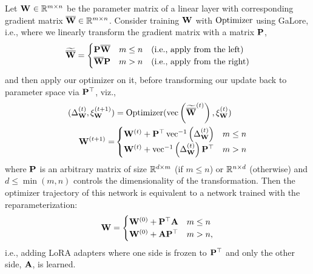 \begin{corollary}
Let ${\mathbf{W}}^{} \in \mathbb{R}^{m \times n}$ be the parameter matrix of a linear layer with corresponding gradient matrix $\overline{{\mathbf{W}}} \in \mathbb{R}^{m \times n}$.
Consider training ${\mathbf{W}}$ with $\operatorname{Optimizer}$ using GaLore, i.e., where we linearly transform the gradient matrix with a matrix ${\mathbf{P}}$,
\begin{align*}
    \widetilde{\overline{{\mathbf{W}}}} = \begin{cases}
        \mathbf{P} \overline{{\mathbf{W}}} & m \le n \,\,\,\,\,\, \text{(i.e., apply from the left)}\\
        \overline{{\mathbf{W}}} {\mathbf{P}} & m > n \,\,\,\,\,\, \text{(i.e., apply from the right)}\\
    \end{cases}
\end{align*}
and then apply our optimizer on it, before transforming our update back to parameter space via ${\mathbf{P}}^\top$, viz.,%
\begin{align*}
   (\Delta_{{\mathbf{W}}}^{(t)}, \xi_{{\mathbf{W}}}^{(t+1)}) &= \operatorname{Optimizer}(\operatorname{vec}\left(\widetilde{\overline{{\mathbf{W}}}}^{(t)}\right), \xi_{{\mathbf{W}}}^{(t)}) \\
   {\mathbf{W}}^{(t+1)} = &\begin{cases}
   {\mathbf{W}}^{(t)} + {\mathbf{P}}^{\top}\operatorname{vec}^{-1}\left(\Delta_{{\mathbf{W}}}^{(t)}\right) & m \le n \\
   {\mathbf{W}}^{(t)} + \operatorname{vec}^{-1}\left(\Delta_{{\mathbf{W}}}^{(t)}\right){\mathbf{P}}^{\top} & m > n \\
   \end{cases}
\end{align*}
where ${\mathbf{P}}$ is an arbitrary matrix of size $\mathbb{R}^{d \times m}$ (if $m \le n$) or $\mathbb{R}^{n \times d}$ (otherwise) and $d \le \min(m, n)$ controls the dimensionality of the transformation.
Then the optimizer trajectory of this network is equivalent to a network trained with the reparameterization:
\begin{align*}
{\mathbf{W}} = \begin{cases}
{\mathbf{W}}^{(0)} + {\mathbf{P}}^\top {\mathbf{A}} & m \le n \\
{\mathbf{W}}^{(0)} + {\mathbf{A}} {\mathbf{P}}^\top & m > n,
\end{cases}
\end{align*}
i.e., adding LoRA adapters where one side is frozen to ${\mathbf{P}}^\top$ and only the other side, ${\mathbf{A}}$, is learned.
\end{corollary}


